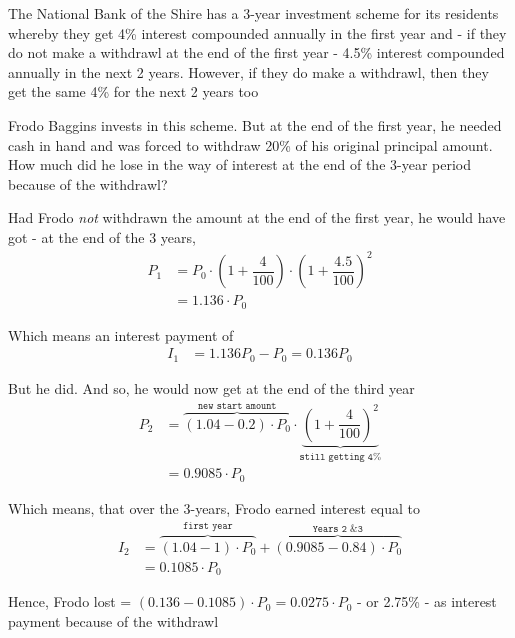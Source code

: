 

\question[5]  The National Bank of the Shire has a 3-year investment scheme
for its residents whereby they get 4\% interest compounded annually in the 
first year and - if they do not make a withdrawl at the end of the first year - 
4.5\% interest compounded annually in the next 2 years. However, if they do make
a withdrawl, then they get the same 4\% for the next 2 years too

Frodo Baggins invests in this scheme. But at the end of the first year, 
he needed cash in hand and was forced to withdraw 20\% of his original principal amount.
How much did he lose in the way of interest at the end of the 3-year period because
of the withdrawl?


\ifprintanswers
\fi 

\begin{solution}[\fullpage]
	Had Frodo \textit{not} withdrawn the amount at the end of the first year, he would have
	 got - at the end of the 3 years,
	\begin{align}
		P_1 &= P_0\cdot\left(1+\dfrac{4}{100}\right)\cdot\left(1+\dfrac{4.5}{100}\right)^{2} \\
		    &= 1.136\cdot P_0
	\end{align}
	
	Which means an interest payment of
	\begin{align}
		I_1 &= 1.136 P_0 - P_0 = 0.136 P_0
	\end{align}
	
	But he did. And so, he would now get at the end of the third year
	\begin{align}
		P_2 &= \overbrace{(1.04-0.2)\cdot P_0}^{\texttt{new start amount}}\cdot
		\underbrace{\left( 1 + \dfrac{4}{100}\right)^2}_{\texttt{still getting 4\%}} \\
		&= 0.9085\cdot P_0
	\end{align}
	
	Which means, that over the 3-years, Frodo earned interest equal to
	\begin{align}
		I_2 &= \overbrace{(1.04 - 1)\cdot P_0}^{\texttt{first year}} + 
		       \overbrace{(0.9085 - 0.84)\cdot P_0}^{\texttt{Years 2 \& 3}} \\
		    &= 	0.1085\cdot P_0
	\end{align}
	
	Hence, Frodo lost = $(0.136 - 0.1085)\cdot P_0 = 0.0275\cdot P_0$ - or 2.75\% - as interest 
	payment because of the withdrawl
	
\end{solution}
